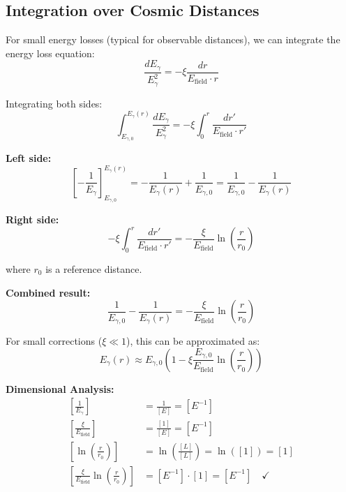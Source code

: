 \documentclass[12pt,a4paper]{report}
\begin{document}
	\subsection{Integration over Cosmic Distances}
	\label{subsec:integration_cosmic_distances}
	
	For small energy losses (typical for observable distances), we can integrate the energy loss equation:
	\begin{equation}
		\frac{dE_\gamma}{E_\gamma^2} = -\xi \frac{dr}{E_{\text{field}} \cdot r}
	\end{equation}
	
	Integrating both sides:
	\begin{equation}
		\int_{E_{\gamma,0}}^{E_\gamma(r)} \frac{dE_\gamma}{E_\gamma^2} = -\xi \int_0^r \frac{dr'}{E_{\text{field}} \cdot r'}
	\end{equation}
	
	\textbf{Left side:}
	\begin{equation}
		\left[-\frac{1}{E_\gamma}\right]_{E_{\gamma,0}}^{E_\gamma(r)} = -\frac{1}{E_\gamma(r)} + \frac{1}{E_{\gamma,0}} = \frac{1}{E_{\gamma,0}} - \frac{1}{E_\gamma(r)}
	\end{equation}
	
	\textbf{Right side:}
	\begin{equation}
		-\xi \int_0^r \frac{dr'}{E_{\text{field}} \cdot r'} = -\frac{\xi}{E_{\text{field}}} \ln\left(\frac{r}{r_0}\right)
	\end{equation}
	
	where $r_0$ is a reference distance.
	
	\textbf{Combined result:}
	\begin{equation}
		\frac{1}{E_{\gamma,0}} - \frac{1}{E_\gamma(r)} = -\frac{\xi}{E_{\text{field}}} \ln\left(\frac{r}{r_0}\right)
	\end{equation}
	
	For small corrections ($\xi \ll 1$), this can be approximated as:
	\begin{equation}
		E_\gamma(r) \approx E_{\gamma,0} \left(1 - \xi \frac{E_{\gamma,0}}{E_{\text{field}}} \ln\left(\frac{r}{r_0}\right)\right)
	\end{equation}
	
	\textbf{Dimensional Analysis:}
	\begin{align}
		\left[\frac{1}{E_\gamma}\right] &= \frac{1}{[E]} = [E^{-1}] \\
		\left[\frac{\xi}{E_{\text{field}}}\right] &= \frac{[1]}{[E]} = [E^{-1}] \\
		\left[\ln\left(\frac{r}{r_0}\right)\right] &= \ln\left(\frac{[L]}{[L]}\right) = \ln([1]) = [1] \\
		\left[\frac{\xi}{E_{\text{field}}} \ln\left(\frac{r}{r_0}\right)\right] &= [E^{-1}] \cdot [1] = [E^{-1}] \quad \checkmark
	\end{align}
	
\end{document}
